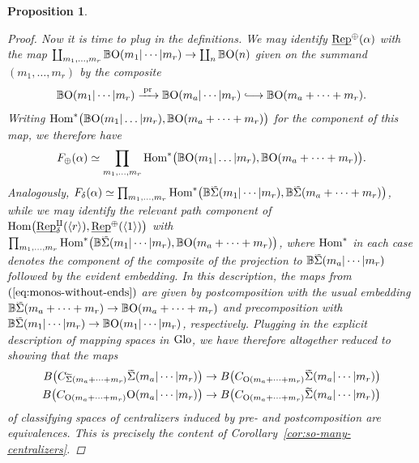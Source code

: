 \documentclass[reqno]{memo-l}
\theoremstyle{mythm}
\newtheorem{prop}[thm]{Proposition}
\theoremstyle{definition}
\numberwithin{equation}{section}
\renewcommand{\hom}{\textup{hom}}
\renewcommand{\O}{{\textup{O}}}
\newcommand{\Sig}{\smash{\widetilde{\vphantom{t}\smash{\Sigma}}}}
\renewcommand{\hom}{{\textup{Hom}}}
\newcommand{\pr}{\textup{pr}}
\newcommand{\Glo}{\textup{Glo}}
\newcommand{\BGcat}[1]{\mathbb B{#1}}
\newcommand{\ulhelper}[2]{\underline{\setbox0=\hbox{$#1#2$}\dp0=0.4pt \box0\relax}}
\newcommand{\ul}[1]{{\mathpalette\ulhelper{#1}}\hbox{\rule[-2pt]{0pt}{0pt}}}
\newcommand{\Vect}{\textup{Rep}}
\begin{document}
\begin{prop}
\begin{proof}
        Now it is time to plug in the definitions. We may identify $\ul\Vect^\oplus(\alpha)$ with the map $\coprod_{m_1,\dots,m_r}\BGcat{\O(m_1|\cdots|m_r)}\to\coprod_{n}\BGcat{\O(n)}$ given on the summand $(m_1,\dots,m_r)$ by the composite 
        \[
            \BGcat{\O(m_1|\cdots|m_r)}\xrightarrow{\;\pr\;}
            \BGcat{\O(m_a|\cdots|m_r)}\lhook\joinrel\longrightarrow
            \BGcat{\O(m_a+\cdots+m_r)}.
        \]
        Writing $\hom^*\big(\BGcat{\O(m_1|\dots|m_r)},\BGcat{\O(m_a+\cdots+m_r)}\big)$ for the component of this map, we therefore have
        \[
            F_\oplus(\alpha)\simeq\prod_{m_1,\dots,m_r}\hom^*\big(\BGcat{\O(m_1|\dots|m_r)},\BGcat{\O(m_a+\cdots+m_r)}\big).
        \]
        Analogously, $F_\delta(\alpha)\simeq\prod_{m_1,\dots,m_r}\hom^*\big(\BGcat{\Sig(m_1|\cdots|m_r)},\BGcat{\Sig(m_a+\cdots+m_r)}\big)$, while we may identify the relevant path component of $\hom\big(\ul\Vect^\amalg_\delta(\langle r\rangle),\ul\Vect^\oplus(\langle 1\rangle)\big)$ with $\prod_{m_1,\dots,m_r}\hom^*\big(\BGcat{\Sig(m_1|\cdots|m_r)},\BGcat{\O(m_a+\cdots+m_r)}\big)$, where $\hom^*$ in each case denotes the component of the composite of the projection to $\BGcat{\Sig(m_a|\cdots|m_r)}$ followed by the evident embedding. In this description, the maps from $(\ref{eq:monos-without-ends})$ are given by postcomposition with the usual embedding $\BGcat{\Sig(m_a+\cdots+m_r)}\to\BGcat{\O(m_a+\cdots+m_r)}$ and precomposition with $\BGcat{\Sig(m_1|\cdots|m_r)}\to\BGcat{\O(m_1|\cdots|m_r)}$, respectively. Plugging in the explicit description of mapping spaces in $\Glo$, we have therefore altogether reduced to showing that the maps
        \begin{align*}
            B\big(C_{\Sig(m_a+\cdots+m_r)}\Sig(m_a|\cdots|m_r)\big)&\to
            B\big(C_{\O(m_a+\cdots+m_r)}\Sig(m_a|\cdots|m_r)\big)\\
            B\big(C_{\O(m_a+\cdots+m_r)}\O(m_a|\cdots|m_r)\big)&\to
            B\big(C_{\O(m_a+\cdots+m_r)}\Sig(m_a|\cdots|m_r)\big)
        \end{align*}
        of classifying spaces of centralizers induced by pre- and postcomposition are equivalences. This is precisely the content of Corollary~\ref{cor:so-many-centralizers}.
    \end{proof}
\end{prop}
\end{document}
